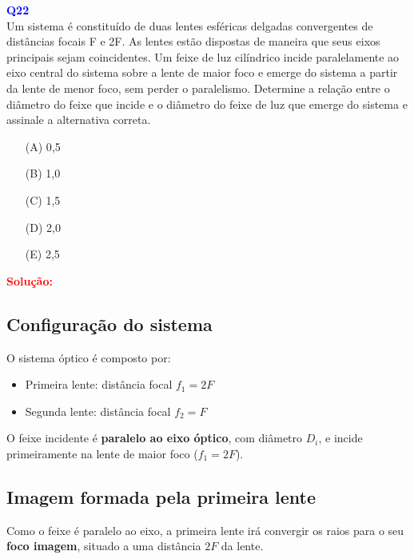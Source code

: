 \documentclass[a4paper,12pt]{article}
\begin{document}
\begin{flushleft}
\textbf{\textcolor{blue}{\Large Q22}}\\

Um sistema é constituído de duas lentes esféricas delgadas convergentes de distâncias focais F e
2F. As lentes estão dispostas de maneira que seus eixos principais sejam coincidentes. Um
feixe de luz cilíndrico incide paralelamente ao eixo central do sistema sobre a lente de maior foco e
emerge do sistema a partir da lente de menor foco, sem perder o paralelismo. Determine a
relação entre o diâmetro do feixe que incide e o diâmetro do feixe de luz que emerge do sistema e
assinale a alternativa correta.


\begin{itemize}
\item[(A)] 0{,}5
\item[(B)] 1,0
\item[(C)] 1,5
\item[(D)] 2,0
\item[(E)] 2,5
\end{itemize}

\vspace{0.5cm}

\textcolor{red}{\textbf{Solução:}}\\

\subsection*{Configuração do sistema}

O sistema óptico é composto por:

\begin{itemize}
    \item Primeira lente: distância focal \( f_1 = 2F \)
    \item Segunda lente: distância focal \( f_2 = F \)
\end{itemize}

O feixe incidente é \textbf{paralelo ao eixo óptico}, com diâmetro \( D_i \), e incide primeiramente na lente de maior foco (\( f_1 = 2F \)).

\subsection*{Imagem formada pela primeira lente}

Como o feixe é paralelo ao eixo, a primeira lente irá convergir os raios para o seu \textbf{foco imagem}, situado a uma distância \( 2F \) da lente.


\end{flushleft}
\end{document}
